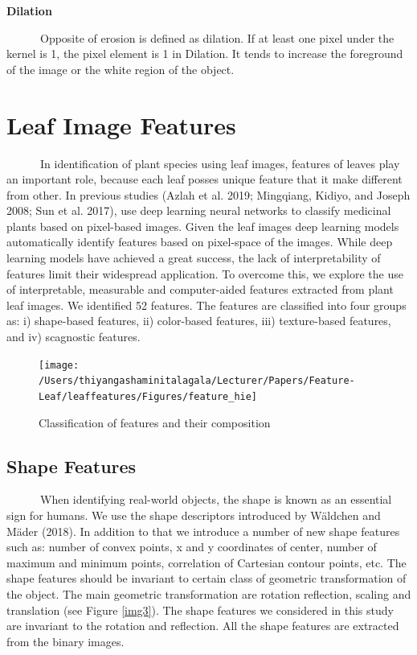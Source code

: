 \documentclass{article}
\begin{document}
\textbf{Dilation}

~~~~~~Opposite of erosion is defined as dilation. If at least one pixel
under the kernel is 1, the pixel element is 1 in Dilation. It tends to
increase the foreground of the image or the white region of the object.

\hypertarget{leaf-image-features}{%
\section{Leaf Image Features}\label{leaf-image-features}}

~~~~~~In identification of plant species using leaf images, features of
leaves play an important role, because each leaf posses unique feature
that it make different from other. In previous studies (Azlah et al.
2019; Mingqiang, Kidiyo, and Joseph 2008; Sun et al. 2017), use deep
learning neural networks to classify medicinal plants based on
pixel-based images. Given the leaf images deep learning models
automatically identify features based on pixel-space of the images.
While deep learning models have achieved a great success, the lack of
interpretability of features limit their widespread application. To
overcome this, we explore the use of interpretable, measurable and
computer-aided features extracted from plant leaf images. We identified
52 features. The features are classified into four groups as: i)
shape-based features, ii) color-based features, iii) texture-based
features, and iv) scagnostic features.

\begin{figure}[!ht]

{\centering \texttt{[image: /Users/thiyangashaminitalagala/Lecturer/Papers/Feature-Leaf/leaffeatures/Figures/feature\_hie]} 

}

\caption{\label{img33}Classification of features and their composition}\label{fig:unnamed-chunk-4}
\end{figure}

\hypertarget{shape-features}{%
\subsection{Shape Features}\label{shape-features}}

~~~~~~When identifying real-world objects, the shape is known as an
essential sign for humans. We use the shape descriptors introduced by
Wäldchen and Mäder (2018). In addition to that we introduce a number of
new shape features such as: number of convex points, x and y coordinates
of center, number of maximum and minimum points, correlation of
Cartesian contour points, etc. The shape features should be invariant to
certain class of geometric transformation of the object. The main
geometric transformation are rotation reflection, scaling and
translation (see Figure \ref{img3}). The shape features we considered in
this study are invariant to the rotation and reflection. All the shape
features are extracted from the binary images.
\end{document}
